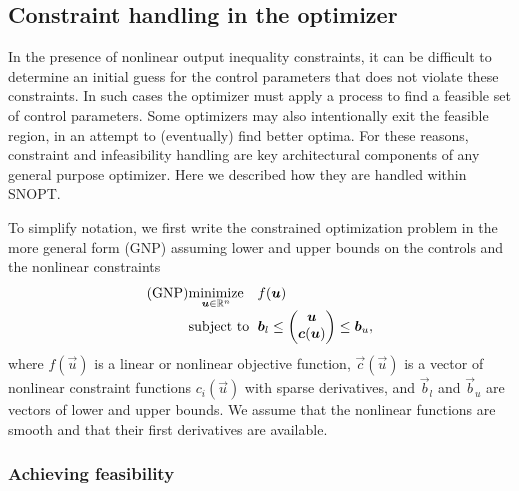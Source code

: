 \documentclass[twocolumn,numbook]{svjour3}          %
\makeatletter
\def\u{{\vec u}}
\def\c{{\vec c}}
\def\b{{\vec b}}
\def\A{{\vec A}}
\def\minim{\mathop{\hbox{\rm minimize}}}
\def\minimize#1{{\displaystyle\minim_{#1}}}
\def\subject{\mbox{\rm subject to}}
\def\strutl{\rule[-1.25ex]{0pt}{3ex}}%
\def\SNOPT {{\small SNOPT}}
\def\problem#1#2#3#4{%
   {\begin{tabular*}{0.47\textwidth}
    {@{}l@{\extracolsep{\fill}}l@{\extracolsep{6pt}}l@{\extracolsep{\fill}}c@{}}
      #1 & $\minimize{#2}$ & $#3$ & $ $ \\[5pt]
         & $\subject$      & $#4$ & $ $
    \end{tabular*}}}
\newcommand{\pmat}[1]{\begin{pmatrix}#1\end{pmatrix}}
\makeatother
\begin{document}



\subsection{Constraint handling in the optimizer} \label{sec:constr-opt}
In the presence of nonlinear output inequality constraints, 
it can be difficult to determine an initial guess for the control parameters that does 
not violate these constraints. In such cases
the optimizer must apply a process to find a feasible set of control parameters. Some optimizers may also intentionally exit the feasible region, in an attempt to (eventually) find better optima. For these reasons, constraint and infeasibility handling are key architectural components of any general purpose optimizer. Here we described how they are handled within \SNOPT{}. 

To simplify notation, we first write the constrained optimization problem in the more 
general form (GNP) assuming lower and upper bounds on the controls and the nonlinear
constraints
$$
   \problem{(GNP)}{\u \in \mathbb R^n}{f(\u)}
      {\b_l \le \pmat{\u\\\c(\u)\strutl} \le \b_u,}
$$
where $f(\u)$ is a linear or nonlinear objective function,
$\c(\u)$ is a vector of nonlinear constraint functions $c_i(\u)$
with sparse derivatives, and $\b_l$ and $\b_u$
are vectors of lower and upper bounds.
We assume that the nonlinear functions are smooth and that their first
derivatives are available.

\subsubsection{Achieving feasibility} \label{sec-infeas}
\end{document}

